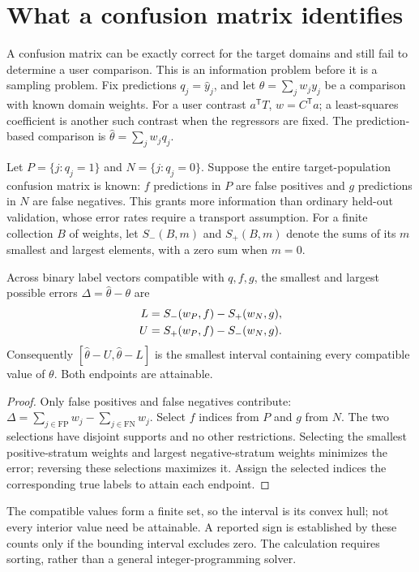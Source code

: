 \section{What a confusion matrix identifies}\label{sec:identification}
A confusion matrix can be exactly correct for the target domains and still fail
to determine a user comparison. This is an information problem before it is a
sampling problem. Fix predictions $q_j=\widehat y_j$, and let
$\theta=\sum_j w_jy_j$ be a comparison with known domain weights.
For a user contrast $a^{\mathsf T}T$, $w=C^{\mathsf T}a$; a least-squares
coefficient is another such contrast when the regressors are fixed.
The prediction-based comparison is $\widehat\theta=\sum_jw_jq_j$.

Let $P=\{j:q_j=1\}$ and $N=\{j:q_j=0\}$. Suppose the entire target-population
confusion matrix is known: $f$ predictions in $P$ are false positives and $g$
predictions in $N$ are false negatives. This grants more information than ordinary
held-out validation, whose error rates require a transport assumption.
For a finite collection $B$ of weights, let $S_-(B,m)$ and $S_+(B,m)$ denote
the sums of its $m$ smallest and largest elements, with a zero sum when $m=0$.

\begin{proposition}\label{prop:bounds}
Across binary label vectors compatible with $q,f,g$, the smallest and largest
possible errors $\Delta=\widehat\theta-\theta$ are
\begin{align}
 L&=S_-(w_P,f)-S_+(w_N,g),\notag\\
 U&=S_+(w_P,f)-S_-(w_N,g).
\end{align}
Consequently $[\widehat\theta-U,\widehat\theta-L]$ is the smallest interval
containing every compatible value of $\theta$. Both endpoints are attainable.
\end{proposition}
\begin{proof}
Only false positives and false negatives contribute:
$\Delta=\sum_{j\in\mathrm{FP}}w_j-\sum_{j\in\mathrm{FN}}w_j$.
Select $f$ indices from $P$ and $g$ from $N$. The two selections have disjoint
supports and no other restrictions. Selecting the smallest positive-stratum
weights and largest negative-stratum weights minimizes the error; reversing
these selections maximizes it. Assign the selected indices the corresponding
true labels to attain each endpoint.
\end{proof}
The compatible values form a finite set, so the interval is its convex hull;
not every interior value need be attainable. A reported sign is established by
these counts only if the bounding interval excludes zero. The calculation
requires sorting, rather than a general integer-programming solver.

